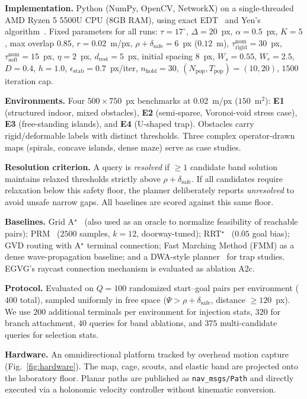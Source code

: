 \documentclass[conference]{IEEEtran}
\begin{document}
\textbf{Implementation.} Python (NumPy, OpenCV, NetworkX) on a single-threaded AMD Ryzen 5 5500U CPU (8GB RAM), using exact EDT~\cite{felzenszwalb2012} and Yen's algorithm~\cite{yen1971}. Fixed parameters for all runs: $\tau=17^\circ$, $\Delta=20$~px, $\alpha=0.5$~px, $K=5$, max overlap $0.85$, $r=0.02$~m/px, $\rho+\delta_{\mathrm{safe}}=6$~px ($0.12$~m), $\tau^{\mathrm{nom}}_{\mathrm{rigid}}=30$~px, $\tau^{\mathrm{nom}}_{\mathrm{soft}}=15$~px, $\eta=2$~px, $d_{\mathrm{rest}}=5$~px, initial spacing $8$~px, $W_s=0.55$, $W_r=2.5$, $D=0.4$, $h=1.0$, $\epsilon_{\mathrm{stab}}=0.7$~px/iter, $n_{\mathrm{hold}}=30$, $(N_{\mathrm{pop}},T_{\mathrm{pop}})=(10,20)$, $1500$ iteration cap.

\textbf{Environments.} Four $500\times750$~px benchmarks at $0.02$~m/px ($150$~m$^2$): \textbf{E1} (structured indoor, mixed obstacles), \textbf{E2} (semi-sparse, Voronoi-void stress case), \textbf{E3} (free-standing islands), and \textbf{E4} (U-shaped trap). Obstacles carry rigid/deformable labels with distinct thresholds. Three complex operator-drawn maps (spirals, concave islands, dense maze) serve as case studies.

\textbf{Resolution criterion.} A query is \emph{resolved} if $\ge 1$ candidate band solution maintains relaxed thresholds strictly above $\rho+\delta_{\mathrm{safe}}$. If all candidates require relaxation below this safety floor, the planner deliberately reports \emph{unresolved} to avoid unsafe narrow gaps. All baselines are scored against this same floor.

\textbf{Baselines.} Grid A$^\star$~\cite{hart1968} (also used as an oracle to normalize feasibility of reachable pairs); PRM~\cite{kavraki1996} ($2500$ samples, $k=12$, doorway-tuned); RRT$^\star$~\cite{karaman2011} ($0.05$ goal bias); GVD routing with A$^\star$ terminal connection; Fast Marching Method (FMM) as a dense wave-propagation baseline; and a DWA-style planner~\cite{fox1997} for trap studies. EGVG's raycast connection mechanism is evaluated as ablation A2c.

\textbf{Protocol.} Evaluated on $Q=100$ randomized start--goal pairs per environment ($400$ total), sampled uniformly in free space ($\Psi>\rho+\delta_{\mathrm{safe}}$, distance $\ge 120$~px). We use $200$ additional terminals per environment for injection stats, $320$ for branch attachment, $40$ queries for band ablations, and $375$ multi-candidate queries for selection stats.

\textbf{Hardware.} An omnidirectional platform tracked by overhead motion capture (Fig.~\ref{fig:hardware}). The map, cage, scouts, and elastic band are projected onto the laboratory floor. Planar paths are published as \texttt{nav\_msgs/Path} and directly executed via a holonomic velocity controller without kinematic conversion.
\end{document}
